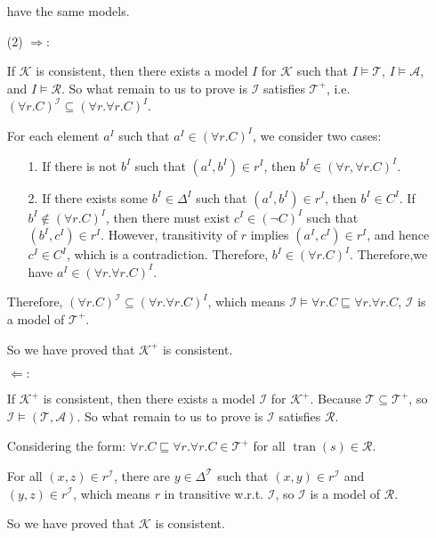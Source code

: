 \documentclass[12pt]{article}
\begin{document}
\begin{enumerate}
        have the same models.
        \item [(2)]
        $\Longrightarrow:$ \par
        If $\mathcal{K}$ is consistent, then there exists a model $I$ for $\mathcal{K}$ such that $I \vDash \mathcal{T}$, $I \vDash \mathcal{A}$, and $I \vDash \mathcal{R}$. So what remain to us to prove is $\mathcal{I}$ satisfies $\mathcal{T}^{+}$, i.e. $(\forall r . C)^\mathcal{I} \subseteq(\forall r . \forall r . C)^I$.\par
        For each element $a^I$ such that $a^I \in(\forall r . C)^I$, we consider two cases:\par
        \begin{enumerate}
            \item [1.] If there is not $b^I$ such that $\left(a^I, b^I\right) \in r^I$, then $b^I \in(\forall r, \forall r . C)^I$.
            \item [2.] If there exists some $b^I \in \Delta^I$ such that $\left(a^I, b^I\right) \in r^I$, then $b^I \in C^I$. If $b^I \notin(\forall r . C)^I$, then there must exist $c^I \in(\neg C)^I$ such that $\left(b^I, c^I\right) \in r^I$. However, transitivity of $r$ implies $\left(a^I, c^I\right) \in r^I$, and hence $c^I \in C^I$, which is a contradiction. Therefore, $b^I \in(\forall r . C)^I$. Therefore,we have $a^I \in(\forall r . \forall r . C)^I$.
        \end{enumerate}
        Therefore, $(\forall r . C)^\mathcal{I} \subseteq(\forall r . \forall r . C)^I$, which means $\mathcal{I} \vDash \forall r . C \sqsubseteq \forall r . \forall r . C$, $\mathcal{I}$ is a model of $\mathcal{T}^{+}$. \par
        So we have proved that $\mathcal{K}^{+}$ is consistent. \par
        $\Longleftarrow:$ \par
        If $\mathcal{K}^{+}$ is consistent, then there exists a model $\mathcal{I}$ for $\mathcal{K}^{+}$. Because $\mathcal{T} \subseteq \mathcal{T}^{+}$, so
        $\mathcal{I} \vDash (\mathcal{T}, \mathcal{A})$. So what remain to us to prove is $\mathcal{I}$ satisfies $\mathcal{R}$. \par
        Considering the form: $\forall r . C \sqsubseteq \forall r . \forall r . C \in \mathcal{T}^{+}$ for all $\operatorname{tran}(s) \in \mathcal{R}$.\par
        For all $(x, z) \in r^{\mathcal{I}}$, there are $y \in \Delta^{\mathcal{T}}$ such that $(x, y) \in r^\mathcal{I}$ and $(y, z) \in r^\mathcal{I}$, which means $r$ in transitive w.r.t. $\mathcal{I}$, so $\mathcal{I}$ is a model of $\mathcal{R}$. \par
        So we have proved that $\mathcal{K}$ is consistent. 
    \end{enumerate}
\end{document}
